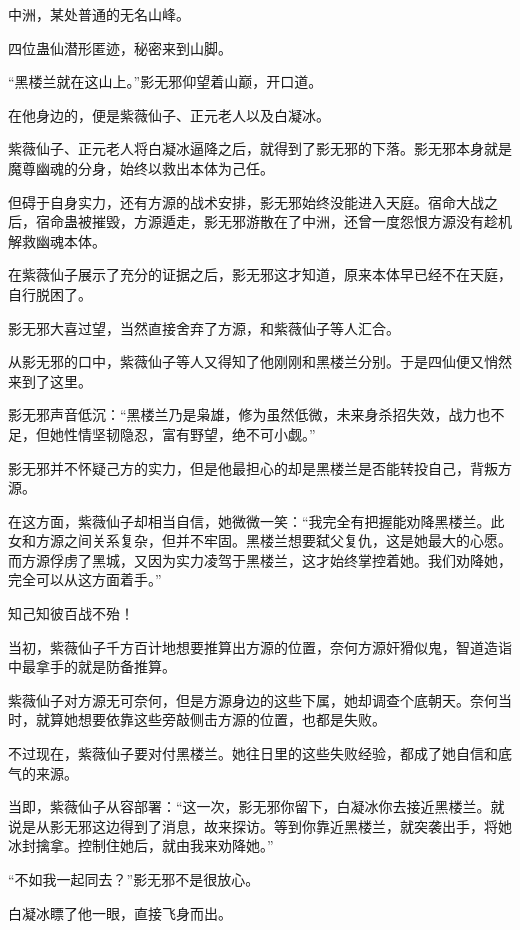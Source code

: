 
\begin{this_body}

中洲，某处普通的无名山峰。

四位蛊仙潜形匿迹，秘密来到山脚。

“黑楼兰就在这山上。”影无邪仰望着山巅，开口道。

在他身边的，便是紫薇仙子、正元老人以及白凝冰。

紫薇仙子、正元老人将白凝冰逼降之后，就得到了影无邪的下落。影无邪本身就是魔尊幽魂的分身，始终以救出本体为己任。

但碍于自身实力，还有方源的战术安排，影无邪始终没能进入天庭。宿命大战之后，宿命蛊被摧毁，方源遁走，影无邪游散在了中洲，还曾一度怨恨方源没有趁机解救幽魂本体。

在紫薇仙子展示了充分的证据之后，影无邪这才知道，原来本体早已经不在天庭，自行脱困了。

影无邪大喜过望，当然直接舍弃了方源，和紫薇仙子等人汇合。

从影无邪的口中，紫薇仙子等人又得知了他刚刚和黑楼兰分别。于是四仙便又悄然来到了这里。

影无邪声音低沉：“黑楼兰乃是枭雄，修为虽然低微，未来身杀招失效，战力也不足，但她性情坚韧隐忍，富有野望，绝不可小觑。”

影无邪并不怀疑己方的实力，但是他最担心的却是黑楼兰是否能转投自己，背叛方源。

在这方面，紫薇仙子却相当自信，她微微一笑：“我完全有把握能劝降黑楼兰。此女和方源之间关系复杂，但并不牢固。黑楼兰想要弑父复仇，这是她最大的心愿。而方源俘虏了黑城，又因为实力凌驾于黑楼兰，这才始终掌控着她。我们劝降她，完全可以从这方面着手。”

知己知彼百战不殆！

当初，紫薇仙子千方百计地想要推算出方源的位置，奈何方源奸猾似鬼，智道造诣中最拿手的就是防备推算。

紫薇仙子对方源无可奈何，但是方源身边的这些下属，她却调查个底朝天。奈何当时，就算她想要依靠这些旁敲侧击方源的位置，也都是失败。

不过现在，紫薇仙子要对付黑楼兰。她往日里的这些失败经验，都成了她自信和底气的来源。

当即，紫薇仙子从容部署：“这一次，影无邪你留下，白凝冰你去接近黑楼兰。就说是从影无邪这边得到了消息，故来探访。等到你靠近黑楼兰，就突袭出手，将她冰封擒拿。控制住她后，就由我来劝降她。”

“不如我一起同去？”影无邪不是很放心。

白凝冰瞟了他一眼，直接飞身而出。


\end{this_body}
